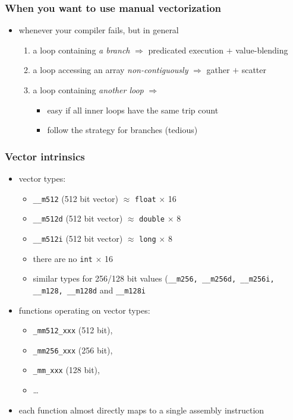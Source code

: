 \documentclass[12pt,dvipdfmx]{beamer}
\newcommand{\mura}[1]{{\color{purple}#1}}
\newcommand{\ao}[1]{{\color{blue}#1}}
\begin{document}
\begin{frame}
  \frametitle{When you want to use manual vectorization}
  \begin{itemize}
  \item whenever your compiler fails, but in general
    \begin{enumerate}
    \item a loop containing \ao{\it a branch}
      $\Rightarrow$ \mura{predicated execution $+$ value-blending}
    \item a loop accessing an array \ao{\it  non-contiguously}
      $\Rightarrow$ \mura{gather $+$ scatter}
    \item a loop containing \ao{\it another loop}
      $\Rightarrow$
      \begin{itemize}
      \item easy if all inner loops have the same trip count
      \item follow the strategy for branches (tedious)
      \end{itemize}
    \end{enumerate}
  \end{itemize}
\end{frame}

\begin{frame}[fragile]
\frametitle{Vector intrinsics}

\begin{itemize}
\item vector types:
  \begin{itemize}
  \item \ao{\tt \_\_m512} (512 bit vector) $\approx$ {\tt float} $\times$ 16
  \item \ao{\tt \_\_m512d} (512 bit vector) $\approx$ {\tt double} $\times$ 8
  \item \ao{\tt \_\_m512i} (512 bit vector) $\approx$ {\tt long} $\times$ 8
  \item there are no {\tt int} $\times$ 16
  \item similar types for 256/128 bit values
    ({\tt \_\_m256, \_\_m256d, \_\_m256i, \_\_m128, \_\_m128d} and
    {\tt \_\_m128i}
  \end{itemize}

\item functions operating on vector types:
  \begin{itemize}
  \item \ao{\tt \_mm512\_xxx} (512 bit),
  \item \ao{\tt \_mm256\_xxx} (256 bit),
  \item \ao{\tt \_mm\_xxx} (128 bit),
  \item \ldots
  \end{itemize}

\item each function almost directly 
  maps to a single assembly instruction
\end{itemize}
\end{frame}
\end{document}
